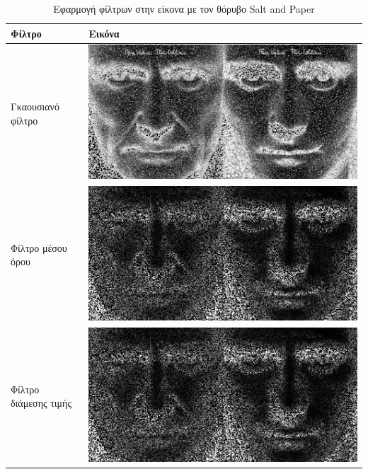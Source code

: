 \begin{table}
	\begin{tabular}{| p{8cm} | p{8cm}|}
		\hline
		\textbf{Φίλτρο} & \textbf{Εικόνα} \\
		\hline
		Γκαουσιανό φίλτρο &
		\includegraphics[width=\linewidth]{Figures/sp_gauss_sharp} \\
		\hline
		Φίλτρο μέσου όρου &
		\includegraphics[width=\linewidth]{Figures/sp_average_sharp} \\
		\hline
		Φίλτρο διάμεσης τιμής &
		\includegraphics[width=\linewidth]{Figures/sp_median_blur} \\
		\hline
	\end{tabular}
	\label{tab:sp}
	\caption{Εφαρμογή φίλτρων στην είκονα με τον θόρυβο Salt and Paper}
\end{table}

